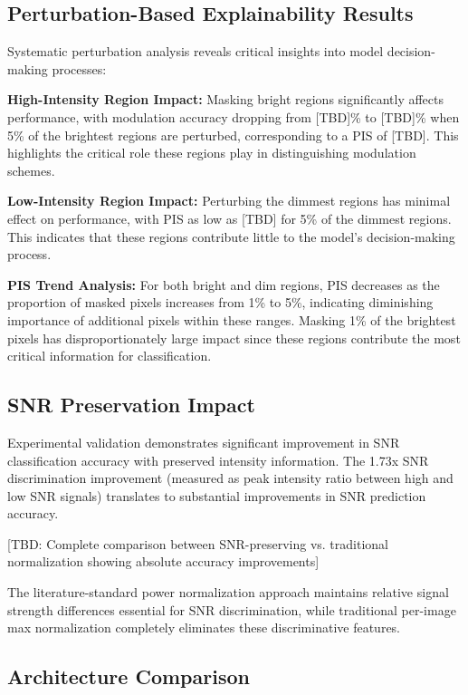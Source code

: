 \documentclass{ELSP}
\begin{document}
{{\subsection{Perturbation-Based Explainability Results}

Systematic perturbation analysis reveals critical insights into model decision-making processes:

\textbf{High-Intensity Region Impact:} Masking bright regions significantly affects performance, with modulation accuracy dropping from [TBD]\% to [TBD]\% when 5\% of the brightest regions are perturbed, corresponding to a PIS of [TBD]. This highlights the critical role these regions play in distinguishing modulation schemes.

\textbf{Low-Intensity Region Impact:} Perturbing the dimmest regions has minimal effect on performance, with PIS as low as [TBD] for 5\% of the dimmest regions. This indicates that these regions contribute little to the model's decision-making process.

\textbf{PIS Trend Analysis:} For both bright and dim regions, PIS decreases as the proportion of masked pixels increases from 1\% to 5\%, indicating diminishing importance of additional pixels within these ranges. Masking 1\% of the brightest pixels has disproportionately large impact since these regions contribute the most critical information for classification.

\subsection{SNR Preservation Impact}

Experimental validation demonstrates significant improvement in SNR classification accuracy with preserved intensity information. The 1.73x SNR discrimination improvement (measured as peak intensity ratio between high and low SNR signals) translates to substantial improvements in SNR prediction accuracy.

[TBD: Complete comparison between SNR-preserving vs. traditional normalization showing absolute accuracy improvements]

The literature-standard power normalization approach maintains relative signal strength differences essential for SNR discrimination, while traditional per-image max normalization completely eliminates these discriminative features.

\subsection{Architecture Comparison}

}}
\end{document}
